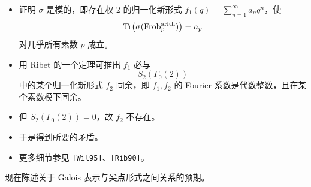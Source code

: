 \begin{itemize}
\begin{itemize}
\item 证明 $\sigma$ 是模的，即存在权 $2$ 的归一化新形式 $f_1(q)=\sum_{n=1}^\infty a_nq^n$，使
\[
\operatorname{Tr}\bigl(\sigma(\operatorname{Frob}_p^{\mathrm{arith}})\bigr)=a_p
\]
对几乎所有素数 $p$ 成立。
\item 用 Ribet 的一个定理可推出 $f_1$ 必与
\[
S_2(\Gamma_0(2))
\]
中的某个归一化新形式 $f_2$ 同余，即 $f_1,f_2$ 的 Fourier 系数是代数整数，且在某个素数模下同余。
\item 但 $S_2(\Gamma_0(2))=0$，故 $f_2$ 不存在。
\item 于是得到所要的矛盾。
\item 更多细节参见 \texttt{[Wil95]}、\texttt{[Rib90]}。
\end{itemize}
\end{itemize}

现在陈述关于 Galois 表示与尖点形式之间关系的预期。

